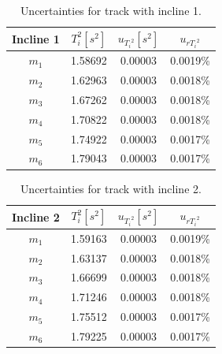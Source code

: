 \documentclass[a4paper,12pt]{article}
\begin{document}
\begin{appendices}
\begin{table}[h]
\begin{center}
\begin{tabular}{|c|c|c|c|}
\hline
Incline 1 & $T_i^2 [s^2] $ & $u_{{T_i}^2} [s^2] $ & $ u_{r{T_i}^2} $\\
\hline
$m_1$ & 1.58692 & 0.00003 & 0.0019\%  \\
$m_2$ & 1.62963 & 0.00003 & 0.0018\%  \\
$m_3$ & 1.67262 & 0.00003 & 0.0018\%  \\
$m_4$ & 1.70822 & 0.00003 & 0.0018\%  \\
$m_5$ & 1.74922 & 0.00003 & 0.0017\%  \\
$m_6$ & 1.79043 & 0.00003 & 0.0017\%  \\
\hline
\end{tabular}
\end{center}
\caption{Uncertainties for track with incline 1.}
\end{table}

\begin{table}[h]
\begin{center}
\begin{tabular}{|c|c|c|c|}
\hline
Incline 2 & $T_i^2 [s^2] $ & $u_{{T_i}^2} [s^2] $ & $ u_{r{T_i}^2} $\\
\hline
$m_1$ & 1.59163 & 0.00003 & 0.0019\%  \\
$m_2$ & 1.63137 & 0.00003 & 0.0018\%  \\
$m_3$ & 1.66699 & 0.00003 & 0.0018\%  \\
$m_4$ & 1.71246 & 0.00003 & 0.0018\%  \\
$m_5$ & 1.75512 & 0.00003 & 0.0017\%  \\
$m_6$ & 1.79225 & 0.00003 & 0.0017\%  \\
\hline
\end{tabular}
\end{center}
\caption{Uncertainties for track with incline 2.}
\end{table}


\end{appendices}
\end{document}
